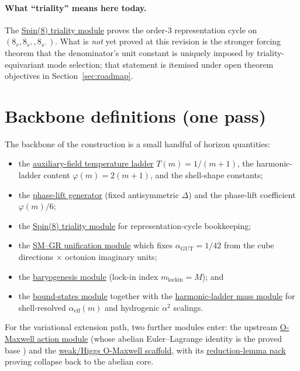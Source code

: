 \documentclass[11pt]{article}
\begin{document}
\paragraph{What ``triality'' means here today.}
The
\hyperref[lean:triality-cycle]{Spin(8) triality module} proves
the order-3 representation cycle on
$(8_v,8_{s^+},8_{s^-})$. What is \emph{not} yet proved at this
revision is the stronger forcing theorem that the denominator's
unit constant is uniquely imposed by triality-equivariant mode
selection; that statement is itemised under open theorem
objectives in Section~\ref{sec:roadmap}.

\section{Backbone definitions (one pass)}
\label{sec:backbone}

The backbone of the construction is a small handful of horizon
quantities:
\begin{itemize}[leftmargin=2em]
\item the
  \hyperref[lean:auxiliary-T]{auxiliary-field temperature
  ladder} $T(m)=1/(m+1)$, the harmonic-ladder content
  $\varphi(m)=2(m+1)$, and the shell-shape constants;
\item the
  \hyperref[lean:phase-lift]{phase-lift generator} (fixed
  antisymmetric $\Delta$) and the phase-lift coefficient
  $\varphi(m)/6$;
\item the
  \hyperref[lean:triality-cycle]{Spin(8) triality module} for
  representation-cycle bookkeeping;
\item the
  \hyperref[lean:sm-gr]{SM--GR unification module} which
  fixes $\alpha_{\mathrm{GUT}}=1/42$ from the cube directions
  $\times$ octonion imaginary units;
\item the
  \hyperref[lean:baryogenesis]{baryogenesis module} (lock-in
  index $m_{\mathrm{lockin}}=M$); and
\item the
  \hyperref[lean:bound-states]{bound-states module} together
  with the
  \hyperref[lean:harmonic-ladder]{harmonic-ladder mass
  module} for shell-resolved $\alpha_{\mathrm{eff}}(m)$ and
  hydrogenic $\alpha^2$ scalings.
\end{itemize}

For the variational extension path, two further modules enter:
the upstream
\hyperref[lean:action]{O-Maxwell action module} (whose
abelian Euler--Lagrange identity is the proved base
\cite{hqiv-oct-action-paper}) and the
\hyperref[lean:weak-higgs]{weak/Higgs O-Maxwell scaffold}, with
its
\hyperref[lean:weak-higgs-reductions]{reduction-lemma pack}
proving collapse back to the abelian core.
\end{document}
